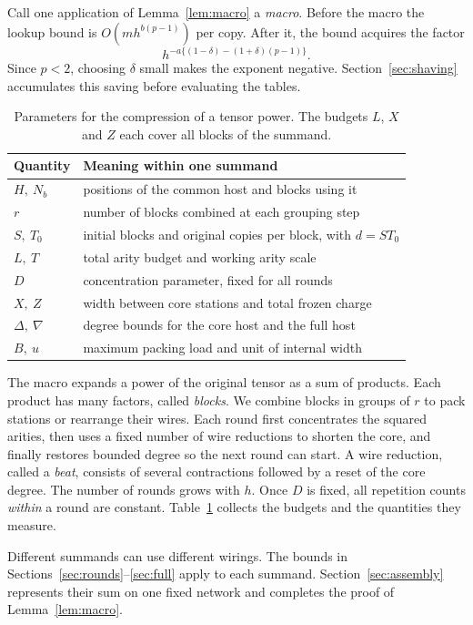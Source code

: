 Call one application of Lemma~\ref{lem:macro} a \emph{macro}.
Before the macro the lookup bound is $O(mh^{b(p-1)})$ per copy.
After it, the bound acquires the factor
\[
       h^{-a\{(1-\delta)-(1+\delta)(p-1)\}} .
\]
Since $p<2$, choosing $\delta$ small makes the exponent negative.
Section~\ref{sec:shaving} accumulates this saving before evaluating the
tables.

\begin{table}[bp]\centering
\small
\begin{tabular}{@{}ll@{}}
\toprule
Quantity & Meaning within one summand\\
\midrule
$H,\ N_b$ & positions of the common host and blocks using it\\
$r$ & number of blocks combined at each grouping step\\
$S,\ T_0$ & initial blocks and original copies per block, with $d=ST_0$\\
$L,\ T$ & total arity budget and working arity scale\\
$D$ & concentration parameter, fixed for all rounds\\[2pt]
$X,\ Z$ & width between core stations and total frozen charge\\
$\Delta,\ \nabla$ & degree bounds for the core host and the full host\\
$B,\ u$ & maximum packing load and unit of internal width\\
\bottomrule
\end{tabular}
\caption{Parameters for the compression of a tensor power. The budgets
$L$, $X$ and $Z$ each cover all blocks of the summand.}
\label{tab:macro}
\end{table}

The macro expands a power of the original tensor as a sum of products.
Each product has many factors, called \emph{blocks}. We combine blocks
in groups of $r$ to pack stations or rearrange their wires. Each round
first concentrates the squared arities, then uses a fixed number of
wire reductions to shorten the core, and finally restores bounded
degree so the next round can start. A wire reduction, called a
\emph{beat}, consists of several contractions followed by a reset of the
core degree. The number of rounds grows with $h$. Once $D$ is fixed,
all repetition counts \emph{within} a round are constant. Table~\ref{tab:macro} collects the budgets and the quantities they measure.

Different summands can use different wirings. The bounds in
Sections~\ref{sec:rounds}--\ref{sec:full} apply to each summand.
Section~\ref{sec:assembly} represents their sum on one fixed network
and completes the proof of Lemma~\ref{lem:macro}.

